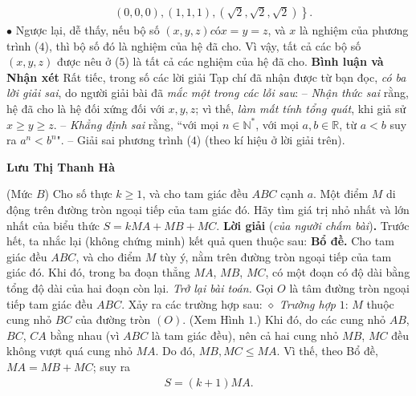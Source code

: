 \begin{multicols}{2}
\begin{align*}
		&\left.\left( {0,0,0} \right)\!,\!\left( {1,1,1} \right)\!,\!\left( {\sqrt 2 ,\sqrt 2 ,\sqrt 2 } \right)\!\! \right\}\!.
	\end{align*}
	$\bullet$ Ngược lại, dễ thấy, nếu bộ số $(x, y, z) có x = y = z$, và $x$ là nghiệm của phương trình ($4$), thì bộ số đó là nghiệm của hệ đã cho.
	\vskip 0.05cm
	Vì vậy, tất cả các bộ số $(x, y, z)$ được nêu ở ($5$) là tất cả các nghiệm của hệ đã cho.
	\vskip 0.05cm
	\textbf{\color{thachthuctoanhoc}Bình luận và Nhận xét}
	\vskip 0.05cm
	Rất tiếc, trong số các lời giải Tạp chí đã nhận được từ bạn đọc, \textit{có ba lời giải sai}, do người giải bài đã \textit{mắc một trong các lỗi sau}:
	\vskip 0.05cm
	-- \textit{Nhận thức sai} rằng, hệ đã cho là hệ đối xứng đối với $x, y, z$; vì thế, \textit{làm mất tính tổng quát}, khi giả sử $x \ge y \ge z$.
	\vskip 0.05cm
	-- \textit{Khẳng định sai} rằng, ``với mọi $n \in \mathbb{N^*}$, với mọi $a,b \in \mathbb{R}$, từ $a < b$ suy ra $a^n < b^n$".
	\vskip 0.05cm
	-- Giải sai phương trình ($4$) (theo kí hiệu ở lời giải trên).
	\begin{flushright}
		\textbf{\color{thachthuctoanhoc}Lưu Thị Thanh Hà}
	\end{flushright}
	{}
	(Mức $B$) Cho số thực $k\ge1$, và cho tam giác đều $ABC$ cạnh $a$. Một điểm $M$ di động trên đường tròn ngoại tiếp của tam giác đó. Hãy tìm giá trị nhỏ nhất và lớn nhất của biểu thức $S=kMA+MB+MC$.
	\vskip 0.05cm
	\textbf{\color{thachthuctoanhoc}Lời giải} (\textit{của người chấm bài})\textbf{\color{thachthuctoanhoc}.}
	\vskip 0.05cm
	Trước hết, ta nhắc lại (không chứng minh) kết quả quen thuộc sau:
	\vskip 0.05cm
	\textbf{\color{thachthuctoanhoc}Bổ đề.} Cho tam giác đều $ABC$, và cho điểm $M$ tùy ý, nằm trên đường tròn ngoại tiếp của tam giác đó. Khi đó, trong ba đoạn thẳng $MA$, $MB$, $MC$, có một đoạn có độ dài bằng tổng độ dài của hai đoạn còn lại.
	\vskip 0.05cm
	\textit{Trở lại bài toán.}
	\vskip 0.05cm
	Gọi $O$ là tâm đường tròn ngoại tiếp tam giác đều $ABC$. Xảy ra các trường hợp sau:
	\vskip 0.05cm
	$\diamond$ \textit{Trường hợp} $1$: $M$ thuộc cung nhỏ $BC$ của đường tròn $(O)$. (Xem Hình $1$.)
	\vskip 0.05cm
	Khi đó, do các cung nhỏ $AB$, $BC$, $CA$ bằng nhau (vì $ABC$ là tam giác đều), nên cả hai cung nhỏ $MB$, $MC$ đều không vượt quá cung nhỏ $MA$. Do đó, $MB, MC \le MA$. Vì thế, theo Bổ đề, $MA = MB + MC$; suy ra
	\begin{align*}
		S = (k + 1)MA.                            \tag{$1$} 
	\end{align*}
	\begin{figure}[H]

\end{figure}
\end{multicols}
